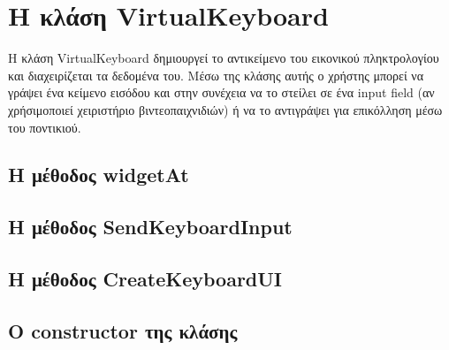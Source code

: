 
\section{Η κλάση VirtualKeyboard}

Η κλάση VirtualKeyboard δημιουργεί το αντικείμενο του εικονικού πληκτρολογίου και διαχειρίζεται
τα δεδομένα του. Μέσω της κλάσης αυτής ο χρήστης μπορεί να γράψει ένα κείμενο εισόδου και στην
συνέχεια να το στείλει σε ένα input field (αν χρήσιμοποιεί χειριστήριο βιντεοπαιχνιδιών) ή να 
το αντιγράψει για επικόλληση μέσω του ποντικιού.  


\subsection{Η μέθοδος widgetAt}


\subsection{Η μέθοδος SendKeyboardInput}

\subsection{Η μέθοδος CreateKeyboardUI}

\subsection{Ο constructor της κλάσης}


\begin{lstlisting}[language=C++, style=cppstyle]
\end{lstlisting}